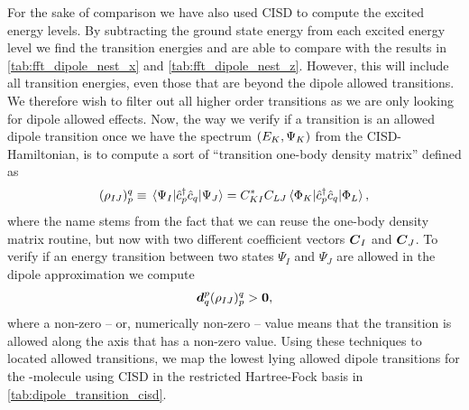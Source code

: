         For the sake of comparison we have also used CISD to compute the excited
        energy levels.
        By subtracting the ground state energy from each excited energy level we
        find the transition energies and are able to compare with the results in
        \autoref{tab:fft_dipole_nest_x} and \autoref{tab:fft_dipole_nest_z}.
        However, this will include all transition energies, even those that are
        beyond the dipole allowed transitions.
        We therefore wish to filter out all higher order transitions as we are
        only looking for dipole allowed effects.
        Now, the way we verify if a transition is an allowed dipole transition
        once we have the spectrum $(E_K, \Psi_K)$ from the
        CISD-Hamiltonian, is to compute a sort of ``transition one-body density
        matrix'' defined as
        \begin{align}
            (\rho_{IJ})^{q}_{p}
            \equiv \mel*{\Psi_I}{
                \hat{c}_{p}^{\dagger}
                \hat{c}_{q}
            }{\Psi_J}
            = C^{*}_{KI} C_{LJ}
            \mel*{\Phi_{K}}{
                \hat{c}_{p}^{\dagger}
                \hat{c}_{q}
            }{\Phi_L},
        \end{align}
        where the name stems from the fact that we can reuse the one-body
        density matrix routine, but now with two different coefficient vectors
        $\boldsymbol{C}_I$ and $\boldsymbol{C}_J$.
        To verify if an energy transition between two states $\Psi_I$ and
        $\Psi_J$ are allowed in the dipole approximation we compute
        \begin{align}
            \boldsymbol{d}^{p}_{q} (\rho_{IJ})^{q}_{p}
            > \boldsymbol{0},
        \end{align}
        where a non-zero -- or, numerically non-zero -- value means that the
        transition is allowed along the axis that has a non-zero value.
        Using these techniques to located allowed transitions, we map the
        lowest lying allowed dipole transitions for the -molecule using
        CISD in the restricted Hartree-Fock basis in
        \autoref{tab:dipole_transition_cisd}.
